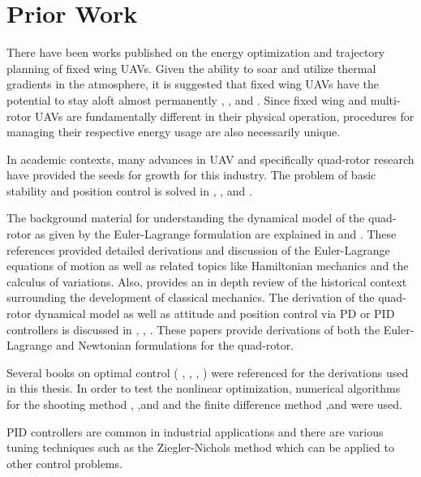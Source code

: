 \section{Prior Work}

There have been works published on the energy optimization and trajectory planning of fixed wing UAVs. Given the ability to soar and utilize thermal gradients in the atmosphere, it is suggested that fixed wing UAVs have the potential to stay aloft almost permanently \cite{langelaan2007long}, \cite{klesh2009solar}, and \cite{lawrance2009guidance}. Since fixed wing and multi-rotor UAVs are fundamentally different in their physical operation, procedures for managing their respective energy usage are also necessarily unique.

In academic contexts, many advances in UAV and specifically quad-rotor research have provided the seeds for growth for this industry. The problem of basic stability and position control is solved in \cite{erginer2007modeling}, \cite{bouabdallah2004pid}, and \cite{Luukkonen}. 


The background material for understanding the dynamical model of the quad-rotor as given by the Euler-Lagrange formulation are explained in \cite{marion1995classical} and  \cite{cornelius1970variational}. These references provided detailed derivations and discussion of the Euler-Lagrange equations of motion as well as related topics like Hamiltonian mechanics and the calculus of variations. Also, \cite{cornelius1970variational} provides an in depth review of the historical context surrounding the development of classical mechanics. The derivation of the quad-rotor dynamical model as well as attitude and position control via PD or PID controllers is discussed in \cite{erginer2007modeling}, \cite{bouabdallah2004pid}, \cite{Luukkonen}. These papers provide derivations of both the Euler-Lagrange and Newtonian formulations for the quad-rotor.

Several books on optimal control (\cite{lewis2012optimal} , \cite{BrysonHo69}, \cite{locatelli2001optimal}, \cite{athans2006optimal}) were referenced for the derivations used in this thesis. In order to test the nonlinear optimization, numerical algorithms for the shooting method \cite{richard1988douglas}, \cite{rao2009engineering},and \cite{keller1992numerical} and the finite difference method \cite{rao2009engineering},and \cite{keller1992numerical} were used. 

PID controllers are common in industrial applications \cite{o2006reducing} and there are various tuning techniques \cite{bequette2003process} such as the Ziegler-Nichols method which can be applied to other control problems.



